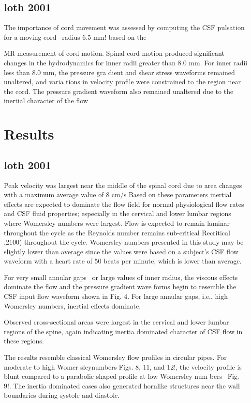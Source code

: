 \documentclass{report}
\begin{document}
\subsection{loth 2001}
The importance of cord movement was assessed by computing
the CSF pulsation for a moving cord ~radius 6.5 mm! based on the

MR measurement of cord motion. Spinal cord motion produced
significant changes in the hydrodynamics for inner radii greater
than 8.0 mm. For inner radii less than 8.0 mm, the pressure gra
dient
and shear stress waveforms remained unaltered, and varia
tions
in velocity profile were constrained to the region near the
cord. The pressure gradient waveform also remained unaltered
due to the inertial character of the flow

\section{Results}

\subsection{loth 2001}

Peak velocity was largest near the middle of the spinal cord due to area changes
with a maximum average value of 8 cm/s
Based on these parameters
inertial effects are expected to dominate the flow field for normal
physiological flow rates and CSF fluid properties; especially in the
cervical and lower lumbar regions where Womersley numbers
were largest.
Flow is expected to remain laminar throughout the
cycle as the Reynolds number remains sub-critical
Recritical
,2100) throughout the cycle.
Womersley numbers presented in this study may be slightly lower than average since the values were based on a subject’s
CSF flow waveform with a heart rate of 50 beats per
minute, which is lower than average.

For very small annular gaps ~or large values of inner radius, the
viscous effects dominate the flow and the pressure gradient wave
forms begin to resemble the CSF input flow waveform shown in
Fig. 4. For large annular gaps, i.e., high Womersley numbers,
inertial effects dominate.

Observed cross-sectional areas were largest in the cervical
and lower lumbar regions of the spine, again indicating inertia
dominated character of CSF flow in these regions.

The results resemble classical Womersley
flow profiles in circular pipes. For moderate to high Womer
sleynumbers Figs. 8, 11, and 12!, the velocity profile is blunt
compared to a parabolic shaped profile at low Womersley num
bers ~Fig. 9!. The inertia dominated cases also generated hornlike
structures near the wall boundaries during systole and diastole.
\end{document}
